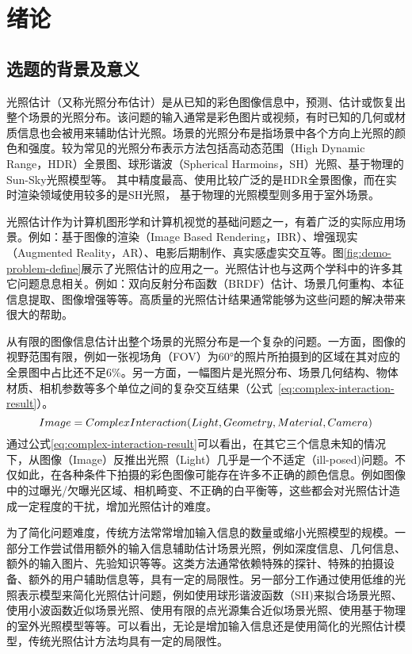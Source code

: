 \chapter{绪论}\label{chap:introduction}

\section{选题的背景及意义}
光照估计（又称光照分布估计）是从已知的彩色图像信息中，预测、估计或恢复出整个场景的光照分布。该问题的输入通常是彩色图片或视频，有时已知的几何或材质信息也会被用来辅助估计光照。场景的光照分布是指场景中各个方向上光照的颜色和强度。较为常见的光照分布表示方法包括高动态范围（High Dynamic Range，HDR）全景图、球形谐波（Spherical Harmoins，SH）光照、基于物理的Sun-Sky光照模型等。
其中精度最高、使用比较广泛的是HDR全景图像，而在实时渲染领域使用较多的是SH光照， 基于物理的光照模型则多用于室外场景。

光照估计作为计算机图形学和计算机视觉的基础问题之一，有着广泛的实际应用场景。例如：基于图像的渲染（Image Based Rendering，IBR）、增强现实（Augmented Reality，AR）、电影后期制作、真实感虚实交互等。图\ref{fig:demo-problem-define}展示了光照估计的应用之一。光照估计也与这两个学科中的许多其它问题息息相关。例如：双向反射分布函数（BRDF）估计、场景几何重构、本征信息提取、图像增强等等。高质量的光照估计结果通常能够为这些问题的解决带来很大的帮助。 

从有限的图像信息估计出整个场景的光照分布是一个复杂的问题。一方面，图像的视野范围有限，例如一张视场角（FOV）为60°的照片所拍摄到的区域在其对应的全景图中占比还不足6\%。另一方面，一幅图片是光照分布、场景几何结构、物体材质、相机参数等多个单位之间的复杂交互结果（公式~\ref{eq:complex-interaction-result}）。
\begin{equation} \centering 
    \label{eq:complex-interaction-result}
    Image = ComplexInteraction(Light, Geometry, Material, Camera)
\end{equation}
通过公式\ref{eq:complex-interaction-result}可以看出，在其它三个信息未知的情况下，从图像（Image）反推出光照（Light）几乎是一个不适定（ill-posed)问题。不仅如此，在各种条件下拍摄的彩色图像可能存在许多不正确的颜色信息。例如图像中的过曝光/欠曝光区域、相机畸变、不正确的白平衡等，这些都会对光照估计造成一定程度的干扰，增加光照估计的难度。

为了简化问题难度，传统方法常常增加输入信息的数量或缩小光照模型的规模。一部分工作尝试借用额外的输入信息辅助估计场景光照，例如深度信息、几何信息、额外的输入图片、先验知识等等。这类方法通常依赖特殊的探针、特殊的拍摄设备、额外的用户辅助信息等，具有一定的局限性。另一部分工作通过使用低维的光照表示模型来简化光照估计问题，例如使用球形谐波函数（SH)来拟合场景光照、使用小波函数近似场景光照、使用有限的点光源集合近似场景光照、使用基于物理的室外光照模型等等。可以看出，无论是增加输入信息还是使用简化的光照估计模型，传统光照估计方法均具有一定的局限性。

